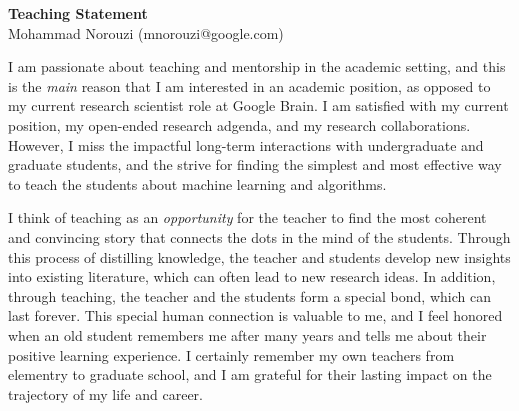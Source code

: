 \documentclass[a4paper, 10pt]{article}
\begin{document}
\thispagestyle{fancy}
\lhead{}
\rhead{}
\renewcommand{\headrulewidth}{0pt} 
\renewcommand{\footrulewidth}{0pt} 


\pagestyle{fancy}
\lhead{\textcolor{gray}{\it Mohammad Norouzi}}


\begin{center}
{\LARGE \bf Teaching Statement}\\
\vspace*{0.1cm}
{\normalsize Mohammad Norouzi (mnorouzi@google.com)}
\vspace*{0.2cm}
\end{center}



\vspace*{-.1cm}
I am passionate about teaching and mentorship in the academic setting,
and this is the {\em main} reason that I am interested in an academic
position, as opposed to my current research scientist role at Google
Brain. I am satisfied with my current position, my open-ended research
adgenda, and my research collaborations.  However, I miss the
impactful long-term interactions with undergraduate and graduate
students, and the strive for finding the simplest and most effective
way to teach the students about machine learning and algorithms.

I think of teaching as an {\em opportunity} for the teacher to find
the most coherent and convincing story that connects the dots in the
mind of the students. Through this process of distilling knowledge,
the teacher and students develop new insights into existing
literature, which can often lead to new research ideas.  In addition,
through teaching, the teacher and the students form a special bond,
which can last forever. This special human connection is valuable to
me, and I feel honored when an old student remembers me after many
years and tells me about their positive learning experience. I
certainly remember my own teachers from elementry to graduate school,
and I am grateful for their lasting impact on the trajectory of my
life and career.
\end{document}
